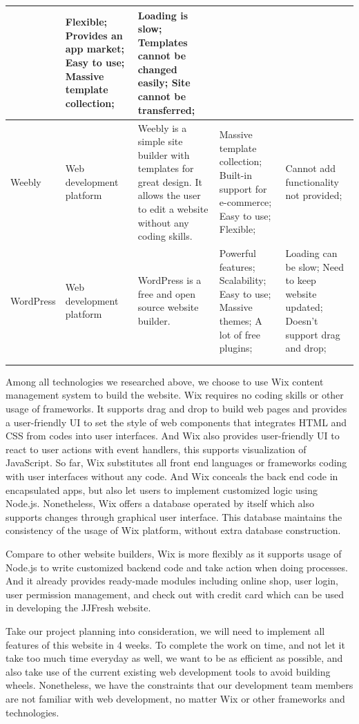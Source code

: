 \documentclass{report}
\begin{document}
\begin{tabularx}{0.95\linewidth}{%
  >{\raggedright\arraybackslash}p{1.5cm}%
  >{\raggedright\arraybackslash}p{1.8cm}%
  >{\raggedright\arraybackslash}X%
  >{\raggedright\arraybackslash}X%
  >{\raggedright\arraybackslash}X}
  & Flexible; Provides an app market; Easy to use; Massive template collection;
  & Loading is slow; Templates cannot be changed easily; Site cannot be transferred;
  \\
  \midrule
  Weebly
  & Web development platform
  & Weebly is a simple site builder with templates for great design. It allows the user to edit a website without any coding skills.
  & Massive template collection; Built-in support for e-commerce; Easy to use; Flexible;
  & Cannot add functionality not provided;
  \\
  \midrule
  WordPress
  & Web development platform
  & WordPress is a free and open source website builder. 
  & Powerful features; Scalability; Easy to use; Massive themes; A lot of free plugins;
  & Loading can be slow; Need to keep website updated; Doesn't support drag and drop;
  \\
  \bottomrule
  \\
  \caption{Available Web Development Technologies}  
  \label{tab:availableWebDevelopmentTechnologies}
\end{tabularx}
Among all technologies we researched above, we choose to use Wix content management system to build the website. Wix requires no coding skills or other usage of frameworks. It supports drag and drop to build web pages and provides a user-friendly UI to set the style of web components that integrates HTML and CSS from codes into user interfaces. And Wix also provides user-friendly UI to react to user actions with event handlers, this supports visualization of JavaScript. So far, Wix substitutes all front end languages or frameworks coding with user interfaces without any code. And Wix conceals the back end code in encapsulated apps, but also let users to implement customized logic using Node.js. Nonetheless, Wix offers a database operated by itself which also supports changes through graphical user interface. This database maintains the consistency of the usage of Wix platform, without extra database construction.

Compare to other website builders, Wix is more flexibly as it supports usage of Node.js to write customized backend code and take action when doing processes. And it already provides ready-made modules including online shop, user login, user permission management, and check out with credit card which can be used in developing the JJFresh website.

Take our project planning into consideration, we will need to implement all features of this website in 4 weeks. To complete the work on time, and not let it take too much time everyday as well, we want to be as efficient as possible, and also take use of the current existing web development tools to avoid building wheels. Nonetheless, we have the constraints that our development team members are not familiar with web development, no matter Wix or other frameworks and technologies.
\end{document}
